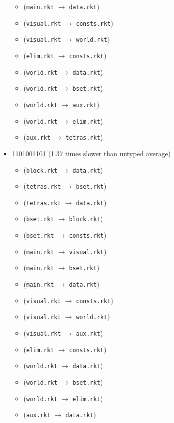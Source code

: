 \documentclass{article}
\newcommand{\mono}[1]{\texttt{#1}}
\begin{document}
\begin{itemize}
\begin{itemize}
  \item (\mono{main.rkt} $\rightarrow$ \mono{data.rkt})
  \item (\mono{visual.rkt} $\rightarrow$ \mono{consts.rkt})
  \item (\mono{visual.rkt} $\rightarrow$ \mono{world.rkt})
  \item (\mono{elim.rkt} $\rightarrow$ \mono{consts.rkt})
  \item (\mono{world.rkt} $\rightarrow$ \mono{data.rkt})
  \item (\mono{world.rkt} $\rightarrow$ \mono{bset.rkt})
  \item (\mono{world.rkt} $\rightarrow$ \mono{aux.rkt})
  \item (\mono{world.rkt} $\rightarrow$ \mono{elim.rkt})
  \item (\mono{aux.rkt} $\rightarrow$ \mono{tetras.rkt})
  \end{itemize}
\item 1101001101 (1.37 times slower than untyped average)
  \begin{itemize}
  \item (\mono{block.rkt} $\rightarrow$ \mono{data.rkt})
  \item (\mono{tetras.rkt} $\rightarrow$ \mono{bset.rkt})
  \item (\mono{tetras.rkt} $\rightarrow$ \mono{data.rkt})
  \item (\mono{bset.rkt} $\rightarrow$ \mono{block.rkt})
  \item (\mono{bset.rkt} $\rightarrow$ \mono{consts.rkt})
  \item (\mono{main.rkt} $\rightarrow$ \mono{visual.rkt})
  \item (\mono{main.rkt} $\rightarrow$ \mono{bset.rkt})
  \item (\mono{main.rkt} $\rightarrow$ \mono{data.rkt})
  \item (\mono{visual.rkt} $\rightarrow$ \mono{consts.rkt})
  \item (\mono{visual.rkt} $\rightarrow$ \mono{world.rkt})
  \item (\mono{visual.rkt} $\rightarrow$ \mono{aux.rkt})
  \item (\mono{elim.rkt} $\rightarrow$ \mono{consts.rkt})
  \item (\mono{world.rkt} $\rightarrow$ \mono{data.rkt})
  \item (\mono{world.rkt} $\rightarrow$ \mono{bset.rkt})
  \item (\mono{world.rkt} $\rightarrow$ \mono{elim.rkt})
  \item (\mono{aux.rkt} $\rightarrow$ \mono{data.rkt})

\end{itemize}
\end{itemize}
\end{document}
